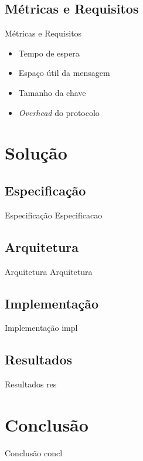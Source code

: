 \documentclass[notes,blue,mathserif]{beamer}
\begin{document}
\subsection{M\'{e}tricas e Requisitos}
\begin{frame}{M\'{e}tricas e Requisitos}
\begin{itemize}[<+->]
\item Tempo de espera
\item Espaço útil da mensagem
\item Tamanho da chave
\item \textit{Overhead} do protocolo
\end{itemize}
\end{frame}

\section{Solu\c{c}\~{a}o}

\subsection{Especifica\c{c}\~{a}o}
\begin{frame}{Especifica\c{c}\~{a}o}
Especificacao
\end{frame}

\subsection{Arquitetura}
\begin{frame}{Arquitetura}
Arquitetura
\end{frame}

\subsection{Implementa\c{c}\~{a}o}
\begin{frame}{Implementa\c{c}\~{a}o}
impl
\end{frame}

\subsection{Resultados}
\begin{frame}{Resultados}
res
\end{frame}


\section{Conclus\~{a}o}
\begin{frame}{Conclus\~{a}o}
concl
\end{frame}
\end{document}
